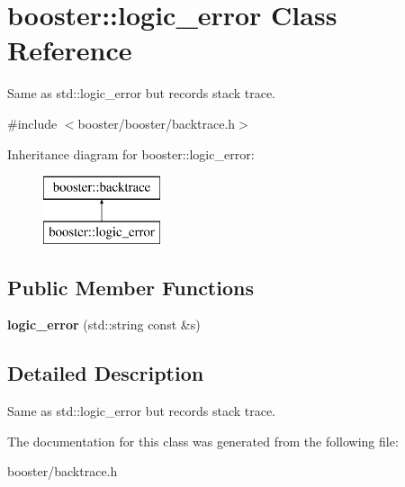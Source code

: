 \section{booster\-:\-:logic\-\_\-error \-Class \-Reference}
\label{classbooster_1_1logic__error}


\-Same as std\-::logic\-\_\-error but records stack trace.  




{\ttfamily \#include $<$booster/booster/backtrace.\-h$>$}

\-Inheritance diagram for booster\-:\-:logic\-\_\-error\-:\begin{figure}[H]
\begin{center}
\leavevmode
\includegraphics[height=2.000000cm]{classbooster_1_1logic__error}
\end{center}
\end{figure}
\subsection*{\-Public \-Member \-Functions}
\begin{DoxyCompactItemize}
\item 
{\bfseries logic\-\_\-error} (std\-::string const \&s)\label{classbooster_1_1logic__error_a278715b977332a5dfd2130167761518f}

\end{DoxyCompactItemize}


\subsection{\-Detailed \-Description}
\-Same as std\-::logic\-\_\-error but records stack trace. 

\-The documentation for this class was generated from the following file\-:\begin{DoxyCompactItemize}
\item 
booster/backtrace.\-h\end{DoxyCompactItemize}

